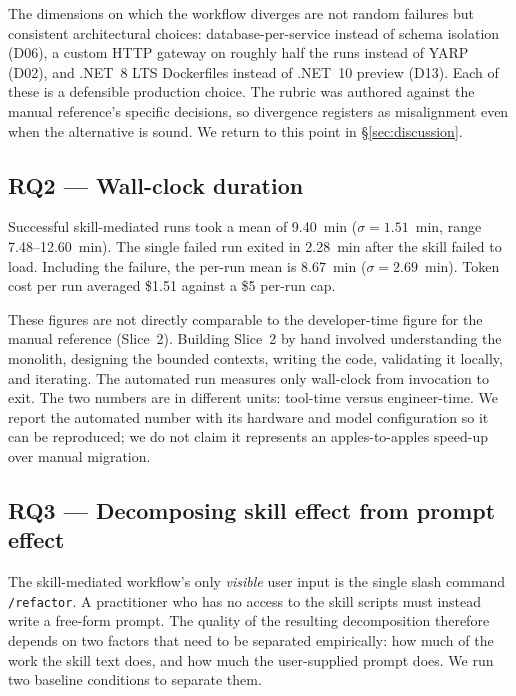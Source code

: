 \documentclass[journal]{IEEEtran}
\begin{document}
The dimensions on which the workflow diverges are not random failures
but consistent architectural choices: database-per-service instead of
schema isolation (D06), a custom HTTP gateway on roughly half the
runs instead of YARP (D02), and .NET~8 LTS Dockerfiles instead of
.NET~10 preview (D13). Each of these is a defensible production
choice. The rubric was authored against the manual reference's
specific decisions, so divergence registers as misalignment even
when the alternative is sound. We return to this point in
\S\ref{sec:discussion}.

\subsection{RQ2 --- Wall-clock duration}

Successful skill-mediated runs took a mean of 9.40~min
($\sigma = 1.51$~min, range 7.48--12.60~min). The single failed run
exited in 2.28~min after the skill failed to load. Including the
failure, the per-run mean is 8.67~min ($\sigma = 2.69$~min). Token
cost per run averaged \$1.51 against a \$5 per-run cap.

These figures are not directly comparable to the developer-time
figure for the manual reference (Slice~2). Building Slice~2 by hand
involved understanding the monolith, designing the bounded contexts,
writing the code, validating it locally, and iterating. The
automated run measures only wall-clock from invocation to exit. The
two numbers are in different units: tool-time versus engineer-time.
We report the automated number with its hardware and model
configuration so it can be reproduced; we do not claim it represents
an apples-to-apples speed-up over manual migration.

\subsection{RQ3 --- Decomposing skill effect from prompt effect}
\label{sec:results-rq3}

The skill-mediated workflow's only \emph{visible} user input is the
single slash command \texttt{/refactor}. A practitioner who has no
access to the skill scripts must instead write a free-form prompt.
The quality of the resulting decomposition therefore depends on
two factors that need to be separated empirically: how much of the
work the skill text does, and how much the user-supplied prompt
does. We run two baseline conditions to separate them.
\end{document}
